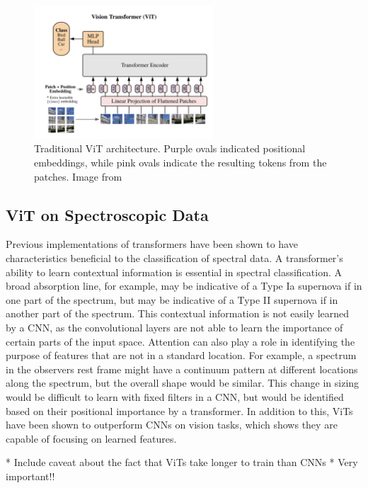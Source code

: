 \begin{figure}[t]
    \centering
    \includegraphics[width=0.6\textwidth]{figures/transformer_paper/ViT_Original.png}
    \caption[ViT Architecture]{Traditional ViT architecture. Purple ovals indicated 
        positional embeddings, while pink ovals indicate the resulting tokens from 
        the patches. Image from \textcite{dosovitskiy2020}
    \label{fig:ViT_orig}}
\end{figure}

\subsection{ViT on Spectroscopic Data}\label{sec:ViT}
Previous implementations of transformers have been shown to have characteristics 
beneficial to the classification of spectral data. A transformer's 
ability to learn contextual information is essential in spectral classification. 
A broad absorption line, for example, may be indicative of a Type Ia supernova 
if in one part of the spectrum, but may be indicative of a Type II supernova if
in another part of the spectrum. This contextual information is not easily learned 
by a CNN, as the convolutional layers are not able to learn the importance of
certain parts of the input space. Attention can also play a role in identifying 
the purpose of features that are not in a standard location. For example, a 
spectrum in the observers rest frame might have a continuum pattern at different locations 
along the spectrum, but the overall shape would be similar. This change in sizing 
would be difficult to learn with fixed filters in a CNN, but would be identified 
based on their positional importance by a transformer. In addition to this, ViTs 
have been shown to outperform CNNs on vision tasks, which shows they are capable 
of focusing on learned features. 


* Include caveat about the fact that ViTs take longer to train than CNNs *
Very important!!


